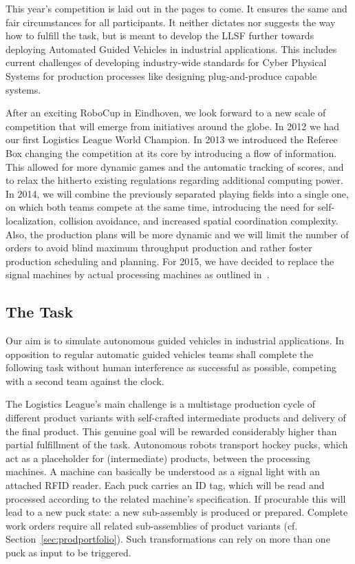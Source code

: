 \documentclass[12pt,twoside]{article}
\newcommand{\refsec}[1]{Section~\ref{#1}}
\begin{document}
This year's competition is laid out in the pages to come. It ensures
the same and fair circumstances for all participants. It neither
dictates nor suggests the way how to fulfill the task, but is meant to
develop the LLSF further towards deploying Automated Guided Vehicles
in industrial applications. This includes current challenges of
developing industry-wide standards for Cyber Physical Systems for
production processes like designing plug-and-produce capable systems.

After an exciting RoboCup in Eindhoven, we look forward to a new scale
of competition that will emerge from initiatives around the globe. In
2012 we had our first Logistics League World Champion.  In 2013 we
introduced the Referee Box changing the competition at its core by
introducing a flow of information.  This allowed for more dynamic
games and the automatic tracking of scores, and to relax the hitherto
existing regulations regarding additional computing power. In 2014, we
will combine the previously separated playing fields into a single
one, on which both teams compete at the same time, introducing the
need for self-localization, collision avoidance, and increased spatial
coordination complexity. Also, the production plans will be more
dynamic and we will limit the number of orders to avoid blind maximum
throughput production and rather foster production scheduling and
planning. For 2015, we have decided to replace the signal machines by
actual processing machines as outlined in~\cite{wdrl2013}.

\subsection{The Task}
\label{sec:task}

Our aim is to simulate autonomous guided vehicles in industrial
applications. In opposition to regular automatic guided vehicles teams
shall complete the following task without human interference as
successful as possible, competing with a second team against the
clock.

The Logistics League's main challenge is a multistage production cycle
of different product variants with self-crafted intermediate products
and delivery of the final product. This genuine goal will be rewarded
considerably higher than partial fulfillment of the task.  Autonomous
robots transport hockey pucks, which act as a placeholder for
(intermediate) products, between the processing machines. A machine
can basically be understood as a signal light with an attached RFID
reader. Each puck carries an ID tag, which will be read and processed
according to the related machine's specification. If procurable this
will lead to a new puck state: a new sub-assembly is produced or
prepared. Complete work orders require all related sub-assemblies of
product variants (cf.  \refsec{sec:prodportfolio}). Such
transformations can rely on more than one puck as input to be
triggered.
\end{document}
